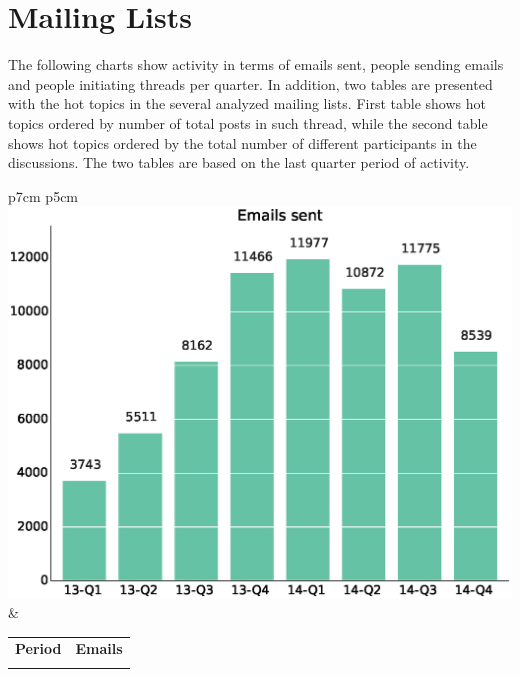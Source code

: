 \documentclass[a4wide,11pt]{report}
\begin{document}
\section{Mailing Lists}

The following charts show activity in terms of emails sent, people sending emails and 
people initiating threads per quarter. In addition, two tables are presented with the hot
topics in the several analyzed mailing lists. First table shows hot topics ordered by
number of total posts in such thread, while the second table shows hot topics ordered by
the total number of different participants in the discussions. The two tables are
based on the last quarter period of activity.

\begin{tabular}{p{7cm} p{5cm}}
    \vspace{0pt} 
    \includegraphics[scale=.35]{figs/emails.eps}
    & 
    \vspace{0pt}
    \begin{tabular}{l|l}%
    \bfseries Period & \bfseries Emails %
    \csvreader[head to column names]{data/emails.csv}{}%
    {\\ & \emails}
    \end{tabular}
\end{tabular}
\end{document}
